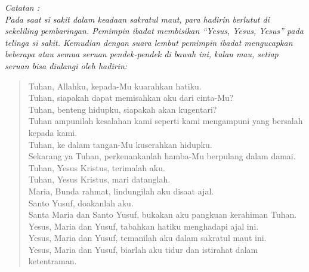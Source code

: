 \textit{Catatan : \\
Pada saat si sakit dalam keadaan sakratul maut, para hadirin 
berlutut di sekeliling pembaringan. Pemimpin ibadat membisikan 
“Yesus, Yesus, Yesus” pada telinga si sakit. 
Kemudian dengan suara lembut pemimpin ibadat mengucapkan 
beberapa atau semua seruan pendek-pendek di bawah ini, kalau 
mau, setiap seruan bisa diulangi oleh hadirin:} 

\begin{verse}
Tuhan, Allahku, kepada-Mu kuarahkan hatiku.\\ 
Tuhan, siapakah dapat memisahkan aku dari cinta-Mu?\\ 
Tuhan, benteng hidupku, siapakah akan kugentari? \\
Tuhan ampunilah kesalahan kami seperti kami mengampuni yang 
bersalah kepada kami.\\ 
Tuhan, ke dalam tangan-Mu kuserahkan hidupku. \\
Sekarang ya Tuhan, perkenankanlah hamba-Mu berpulang dalam 
damai. \\
Tuhan, Yesus Kristus, terimalah aku.\\ 
Tuhan, Yesus Kristus, mari datanglah. \\
Maria, Bunda rahmat, lindungilah aku disaat ajal.\\ 
Santo Yusuf, doakanlah aku. \\
Santa Maria dan Santo Yusuf, bukakan aku pangkuan kerahiman 
Tuhan. \\
Yesus, Maria dan Yusuf, tabahkan hatiku menghadapi ajal ini. \\
Yesus, Maria dan Yusuf, temanilah aku dalam sakratul maut ini. \\
Yesus, Maria dan Yusuf, biarlah aku tidur dan istirahat dalam 
ketentraman. \\
\end{verse}


